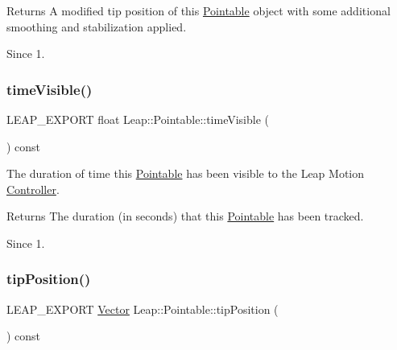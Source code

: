 \begin{DoxyCodeInclude}
\end{DoxyCodeInclude}


\begin{DoxyReturn}{Returns}
A modified tip position of this \hyperlink{class_leap_1_1_pointable}{Pointable} object with some additional smoothing and stabilization applied. 
\end{DoxyReturn}
\begin{DoxySince}{Since}
1. 
\end{DoxySince}
\mbox{\label{class_leap_1_1_pointable_a306431a33ff18a40288c156f52d6f3c4}} 
\subsubsection{\texorpdfstring{time\+Visible()}{timeVisible()}}
{\footnotesize\ttfamily L\+E\+A\+P\+\_\+\+E\+X\+P\+O\+RT float Leap\+::\+Pointable\+::time\+Visible (\begin{DoxyParamCaption}{ }\end{DoxyParamCaption}) const}

The duration of time this \hyperlink{class_leap_1_1_pointable}{Pointable} has been visible to the Leap Motion \hyperlink{class_leap_1_1_controller}{Controller}.


\begin{DoxyCodeInclude}
\end{DoxyCodeInclude}


\begin{DoxyReturn}{Returns}
The duration (in seconds) that this \hyperlink{class_leap_1_1_pointable}{Pointable} has been tracked. 
\end{DoxyReturn}
\begin{DoxySince}{Since}
1. 
\end{DoxySince}
\mbox{\label{class_leap_1_1_pointable_a5f0fcdb12d86567f1c1770d8c8941b17}} 
\subsubsection{\texorpdfstring{tip\+Position()}{tipPosition()}}
{\footnotesize\ttfamily L\+E\+A\+P\+\_\+\+E\+X\+P\+O\+RT \hyperlink{struct_leap_1_1_vector}{Vector} Leap\+::\+Pointable\+::tip\+Position (\begin{DoxyParamCaption}{ }\end{DoxyParamCaption}) const}


